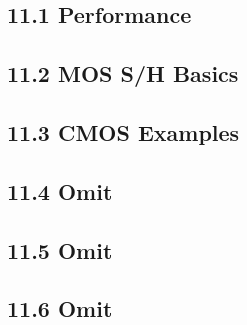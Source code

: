 \subsection{11.1 Performance}
\subsection{11.2 MOS S/H Basics}
\subsection{11.3 CMOS Examples}
\subsection{11.4 Omit}
\subsection{11.5 Omit}
\subsection{11.6 Omit}
